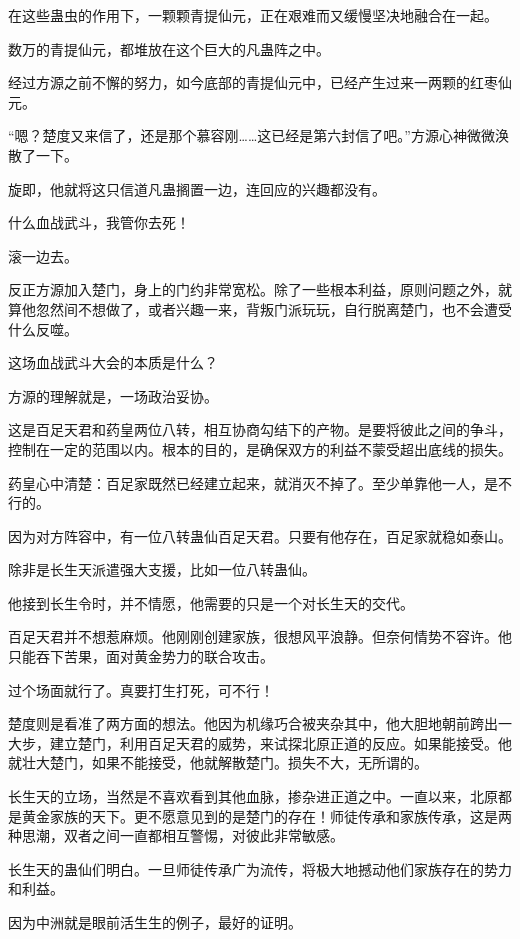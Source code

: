 \begin{this_body}
在这些蛊虫的作用下，一颗颗青提仙元，正在艰难而又缓慢坚决地融合在一起。

数万的青提仙元，都堆放在这个巨大的凡蛊阵之中。

经过方源之前不懈的努力，如今底部的青提仙元中，已经产生过来一两颗的红枣仙元。

“嗯？楚度又来信了，还是那个慕容刚……这已经是第六封信了吧。”方源心神微微涣散了一下。

旋即，他就将这只信道凡蛊搁置一边，连回应的兴趣都没有。

什么血战武斗，我管你去死！

滚一边去。

反正方源加入楚门，身上的门约非常宽松。除了一些根本利益，原则问题之外，就算他忽然间不想做了，或者兴趣一来，背叛门派玩玩，自行脱离楚门，也不会遭受什么反噬。

这场血战武斗大会的本质是什么？

方源的理解就是，一场政治妥协。

这是百足天君和药皇两位八转，相互协商勾结下的产物。是要将彼此之间的争斗，控制在一定的范围以内。根本的目的，是确保双方的利益不蒙受超出底线的损失。

药皇心中清楚：百足家既然已经建立起来，就消灭不掉了。至少单靠他一人，是不行的。

因为对方阵容中，有一位八转蛊仙百足天君。只要有他存在，百足家就稳如泰山。

除非是长生天派遣强大支援，比如一位八转蛊仙。

他接到长生令时，并不情愿，他需要的只是一个对长生天的交代。

百足天君并不想惹麻烦。他刚刚创建家族，很想风平浪静。但奈何情势不容许。他只能吞下苦果，面对黄金势力的联合攻击。

过个场面就行了。真要打生打死，可不行！

楚度则是看准了两方面的想法。他因为机缘巧合被夹杂其中，他大胆地朝前跨出一大步，建立楚门，利用百足天君的威势，来试探北原正道的反应。如果能接受。他就壮大楚门，如果不能接受，他就解散楚门。损失不大，无所谓的。

长生天的立场，当然是不喜欢看到其他血脉，掺杂进正道之中。一直以来，北原都是黄金家族的天下。更不愿意见到的是楚门的存在！师徒传承和家族传承，这是两种思潮，双者之间一直都相互警惕，对彼此非常敏感。

长生天的蛊仙们明白。一旦师徒传承广为流传，将极大地撼动他们家族存在的势力和利益。

因为中洲就是眼前活生生的例子，最好的证明。


\end{this_body}
